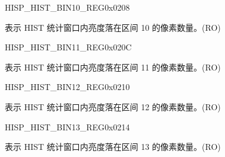 \begin{register}{H}{ISP\_HIST\_BIN10\_REG}{0x0208}\label{regdesc:ISPHISTBIN10REG}
%
%
\regnewline%
\begin{regdesc}\begin{reglist}
\label{fielddesc:ISPHISTBIN10}\item [ISP\_HIST\_BIN\_10] 表示 HIST 统计窗口内亮度落在区间 10 的像素数量。(RO)
\end{reglist}\end{regdesc}
\end{register}


\begin{register}{H}{ISP\_HIST\_BIN11\_REG}{0x020C}\label{regdesc:ISPHISTBIN11REG}
%
%
\regnewline%
\begin{regdesc}\begin{reglist}
\label{fielddesc:ISPHISTBIN11}\item [ISP\_HIST\_BIN\_11] 表示 HIST 统计窗口内亮度落在区间 11 的像素数量。(RO)
\end{reglist}\end{regdesc}
\end{register}


\begin{register}{H}{ISP\_HIST\_BIN12\_REG}{0x0210}\label{regdesc:ISPHISTBIN12REG}
%
%
\regnewline%
\begin{regdesc}\begin{reglist}
\label{fielddesc:ISPHISTBIN12}\item [ISP\_HIST\_BIN\_12] 表示 HIST 统计窗口内亮度落在区间 12 的像素数量。(RO)
\end{reglist}\end{regdesc}
\end{register}


\begin{register}{H}{ISP\_HIST\_BIN13\_REG}{0x0214}\label{regdesc:ISPHISTBIN13REG}
%
%
\regnewline%
\begin{regdesc}\begin{reglist}
\label{fielddesc:ISPHISTBIN13}\item [ISP\_HIST\_BIN\_13] 表示 HIST 统计窗口内亮度落在区间 13 的像素数量。(RO)
\end{reglist}\end{regdesc}
\end{register}


